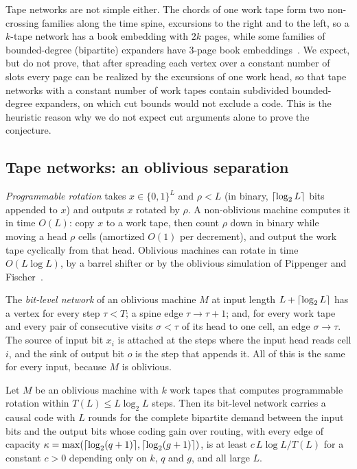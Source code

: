 Tape networks are not simple either. The chords of one work tape form two non-crossing families along the
time spine, excursions to the right and to the left, so a $k$-tape network has a book embedding with $2k$ pages,
while some families of bounded-degree (bipartite) expanders have $3$-page book embeddings~\cite{DSW2016}. We expect, but do not prove, that after
spreading each vertex over a constant number of slots every page can be realized by the excursions of one work head,
so that tape networks with a constant number of work tapes contain subdivided bounded-degree expanders, on which cut
bounds would not exclude a code. This is the heuristic reason why we do not expect cut arguments alone to prove the
conjecture.

\subsection{Tape networks: an oblivious separation}

\emph{Programmable rotation} takes $x\in\{0,1\}^L$ and $\rho<L$ (in binary, $\lceil \log_2 L \rceil$ bits appended to $x$)
and outputs $x$ rotated by $\rho$. A non-oblivious machine computes it in time $O(L)$: copy $x$ to a work tape,
then count $\rho$ down in binary while moving a head $\rho$ cells (amortized $O(1)$ per decrement), and output the
work tape cyclically from that head. Oblivious machines can rotate in time $O(L\log L)$, by a barrel shifter or
by the oblivious simulation of Pippenger and Fischer~\cite{PippengerFischer1979}.

The \emph{bit-level network} of an oblivious machine $M$ at input length $L+\lceil \log_2 L \rceil$ has a vertex for every
step $\tau<T$; a spine edge $\tau\to\tau+1$; and, for every work tape and every pair of consecutive visits
$\sigma<\tau$ of its head to one cell, an edge $\sigma\to\tau$. The source of input bit $x_i$ is attached
at the steps where the input head reads cell $i$, and the sink of output bit $o$ is the step that appends
it. All of this is the same for every input, because $M$ is oblivious.

\begin{proposition}\label{prop:rotation-barrier}
\notformalized
Let $M$ be an oblivious machine with $k$ work tapes that computes programmable rotation within $T(L)\le
L\log_2L$ steps. Then its bit-level network carries a causal code with $L$ rounds for the complete
bipartite demand between the input bits and the output bits whose coding gain over routing, with every edge
of capacity $\kappa=\max(\lceil \log_2 (q+1) \rceil,\lceil \log_2 (g+1) \rceil)$, is at least $c\,L\log L/T(L)$ for a constant $c>0$
depending only on $k$, $q$ and $g$, and all large $L$.
\end{proposition}

